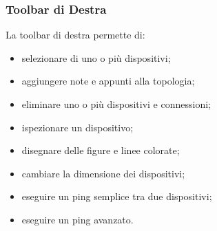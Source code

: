 \subsubsection{Toolbar di Destra}
\begin{minipage}{0.85\textwidth}
    La toolbar di destra permette di:
    \begin{itemize}
        \item selezionare di uno o più dispositivi;
        \item aggiungere note e appunti alla topologia;
        \item eliminare uno o più dispositivi e connessioni;
        \item ispezionare un dispositivo;
        \item disegnare delle figure e linee colorate;
        \item cambiare la dimensione dei dispositivi;
        \item eseguire un ping semplice tra due dispositivi;
        \item eseguire un ping avanzato.
    \end{itemize}
\end{minipage}%
%
